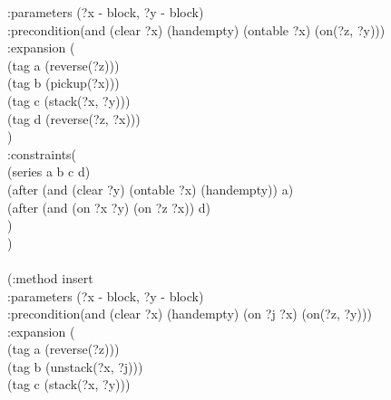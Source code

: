 \begin{appendix}
\hspace*{2cm}  :parameters  (?x - block, ?y - block)\\
\hspace*{2cm}  :precondition(and (clear ?x) (handempty) (ontable ?x) (on(?z, ?y)))\\
\hspace*{2cm}  :expansion  (\\
\hspace*{2.5cm}        (tag a (reverse(?z)))\\
\hspace*{2.5cm}        (tag b (pickup(?x)))\\
\hspace*{2.5cm}        (tag c (stack(?x, ?y)))\\
\hspace*{2.5cm}        (tag d (reverse(?z, ?x)))\\
\hspace*{2cm}  )\\
\hspace*{2cm}  :constraints(\\
\hspace*{2.5cm}        (series a b c d)\\
\hspace*{2.5cm}        (after (and (clear ?y) (ontable ?x) (handempty)) a)\\
\hspace*{2.5cm}        (after (and (on ?x ?y) (on ?z ?x)) d)\\
\hspace*{2cm}  )\\
\hspace*{1.5cm})
\\
\\ \hspace*{1.5cm}(:method insert\\
\hspace*{2cm}  :parameters  (?x - block, ?y - block)\\
\hspace*{2cm}  :precondition(and (clear ?x) (handempty) (on ?j ?x) (on(?z, ?y)))\\
\hspace*{2cm}  :expansion  (\\
\hspace*{2.5cm}        (tag a (reverse(?z)))\\
\hspace*{2.5cm}        (tag b (unstack(?x, ?j)))\\
\hspace*{2.5cm}        (tag c (stack(?x, ?y)))\\

\end{appendix}
